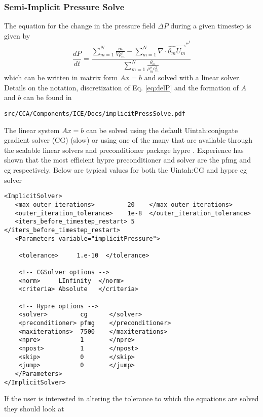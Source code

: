 \subsubsection{Semi-Implicit Pressure Solve}
The equation for the change in the pressure field $\Delta{P}$ during a given
timestep is given by
%
\begin{equation}
    \label{eq:delP}
     \frac{dP}{dt} = 
     \frac{\sum \limits_{{m}=1}^N  \frac{\dot{m}} {V \rho^{o}_m} 
        -  \sum \limits_{{m}=1}^N \nabla \cdot \widehat{\theta_m} \vec{U_m}^{*^{f}}}
          {\sum \limits_{{m}=1}^N \frac{\theta_m}{\rho^{o}_m c_m^2} }
\end{equation}
%
which can be written in matrix form $Ax = b$ and solved with a linear solver.  Details on the
notation, discretization of Eq. \ref{eq:delP} and the formation of $A$
and $b$ can be found in
%
\begin{Verbatim}[fontsize=\footnotesize]
 src/CCA/Components/ICE/Docs/implicitPressSolve.pdf
\end{Verbatim}
%
The linear system $Ax = b$ can be solved using the default Uintah:conjugate
gradient solver (CG) (slow) or using one of the many that are available
through the scalable linear solvers and preconditioner package hypre
\cite{ref:hypre}. Experience has shown that the most efficient hypre
preconditioner and solver are the pfmg and cg respectively.  Below are
typical values for both the Uintah:CG and hypre cg solver
%
\begin{Verbatim}[fontsize=\footnotesize]
<ImplicitSolver>
   <max_outer_iterations>         20    </max_outer_iterations>
   <outer_iteration_tolerance>    1e-8  </outer_iteration_tolerance>
   <iters_before_timestep_restart> 5    </iters_before_timestep_restart>
   <Parameters variable="implicitPressure">

    <tolerance>     1.e-10  </tolerance>
    
    <!-- CGSolver options -->
    <norm>     LInfinity  </norm>
    <criteria> Absolute   </criteria>

    <!-- Hypre options -->
    <solver>         cg      </solver>
    <preconditioner> pfmg    </preconditioner>
    <maxiterations>  7500    </maxiterations>
    <npre>           1       </npre>
    <npost>          1       </npost>
    <skip>           0       </skip>
    <jump>           0       </jump>
   </Parameters>
</ImplicitSolver>
\end{Verbatim}
%
If the user is interested in altering the tolerance to which the equations are solved they should look at
